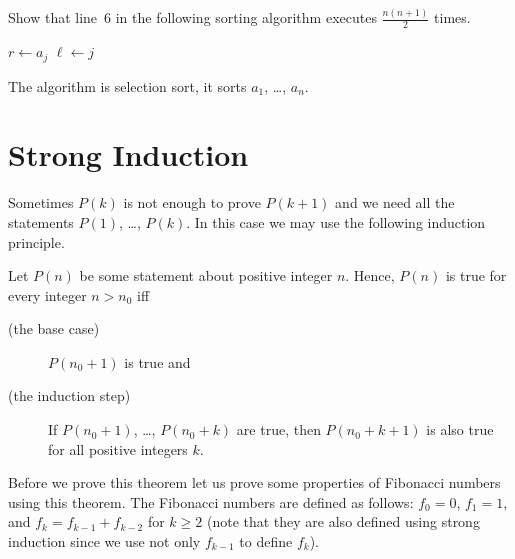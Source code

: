 \begin{exercise}
  Show that line~6 in the following sorting algorithm executes
  $\frac{n (n + 1)}{2}$ times.
  \begin{algorithm}
    \begin{algorithmic}[1]
              \State $r \gets a_j$
              \State $\ell \gets j$
            \EndIf
          \EndFor
        \EndFor
      \EndFunction
    \end{algorithmic}
    \caption{The algorithm is selection sort, it sorts $a_1$, \dots, $a_n$.}
  \end{algorithm}
\end{exercise}



\section{Strong Induction}

Sometimes $P(k)$ is not enough to prove $P(k + 1)$ and we need all the
statements $P(1)$, \dots, $P(k)$. In this case we may use the following
induction  principle.

\begin{theorem}
\label{theorem:strong-induction}
  Let $P(n)$ be some statement about positive integer $n$.
  Hence, $P(n)$ is true for every integer $n > n_0$ iff
  \begin{description}
    \item [(the base case)] $P(n_0 + 1)$ is true and
    \item [(the induction step)] If $P(n_0 + 1)$, \dots, $P(n_0 + k)$ are true,
      then $P(n_0 + k + 1)$ is also true for all positive integers $k$.
  \end{description}
\end{theorem}

Before we prove this theorem let us prove some properties of Fibonacci numbers
using this theorem. The Fibonacci numbers are defined as follows:
$f_0 = 0$, $f_1 = 1$, and $f_k = f_{k - 1} + f_{k - 2}$ for $k \ge 2$ (note
that they are also defined using strong induction since we use not only
$f_{k - 1}$ to define $f_k$).

